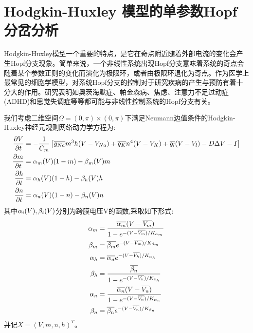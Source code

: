 \documentclass[
pdflinks,
]{xjtuthesis}
\begin{document}
\chapter{Hodgkin-Huxley 模型的单参数Hopf分岔分析}

Hodgkin-Huxley模型一个重要的特点，是它在奇点附近随着外部电流的变化会产生Hopf分支现象。简单来说，一个非线性系统出现Hopf分支意味着系统的奇点会随着某个参数正则的变化而演化为极限环，或者由极限环退化为奇点。作为医学上最常见的细胞学模型，对系统Hopf分支的控制对于研究疾病的产生与预防有着十分大的作用。研究表明如奥茨海默症、帕金森病、焦虑、注意力不足过动症(ADHD)和思觉失调症等等都可能与非线性控制系统的Hopf分支有关。

\medskip

我们考虑二维空间$\Omega=(0,\pi) \times (0,\pi)$下满足Neumann边值条件的Hodgkin-Huxley神经元规则网络动力学方程为:
\begin{align}
\notag \frac{\partial V}{\partial t} &= -\dfrac{1}{C_m} \left[ \overline{g_{Na}} m^3h(V-V_{Na})+ \overline{g_{K}} n^4(V-V_{K})+\overline{g_l}(V-V_{l}) -D \Delta V -I \right] \\
\frac{\partial m}{\partial t} &= \alpha_m (V)(1-m)-\beta_m (V)m \\
\notag \frac{\partial h}{\partial t} &= \alpha_h (V)(1-h)-\beta_h (V)h \\
\notag \frac{\partial n}{\partial t} &= \alpha_n (V)(1-n)-\beta_n (V)n 
\end{align}
其中$\alpha_i (V), \beta_i (V)$分别为跨膜电压V的函数,采取如下形式:
\begin{align}
\notag \alpha_m &= \dfrac{\overline{\alpha_m} (V-\overline{V_m})}{1- e^{-(V-\overline{V_m})/K_{\alpha_m}}} \\
\notag \beta_m &= \overline{\beta_m} e^{-(V-\overline{V_m})/K_{\beta_m}}\\
\notag \alpha_h &= \overline{\alpha_n} e^{-(V-\overline{V_h})/K_{\alpha_h}}\\
\beta_h &= \dfrac{\overline{\beta_n} }{1- e^{-(V-\overline{V_h})/K_{\beta_h}}} \\
\notag \alpha_n &= \dfrac{\overline{\alpha_n} (V-\overline{V_n})}{1- e^{-(V-\overline{V_n})/K_{\alpha_n}}} \\
\notag \beta_n &= \overline{\beta_n} e^{-(V-\overline{V_n})/K_{\beta_n}}
\end{align}
并记$X=(V,m,n,h)^T$。
\end{document}
